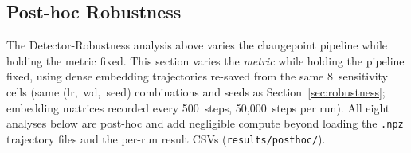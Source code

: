 \documentclass{article}
\begin{document}
\subsection{Post-hoc Robustness}
\label{sec:posthoc}

The Detector-Robustness analysis above varies the changepoint
pipeline while holding the metric fixed.
This section varies the \emph{metric} while holding the pipeline
fixed, using dense embedding trajectories re-saved from the same
8~sensitivity cells (same (lr,~wd,~seed) combinations and seeds as
Section~\ref{sec:robustness}; embedding matrices recorded every
500~steps, 50{,}000~steps per run).
All eight analyses below are post-hoc and add negligible compute
beyond loading the \texttt{.npz} trajectory files and the
per-run result CSVs (\texttt{results/posthoc/}).
\end{document}
